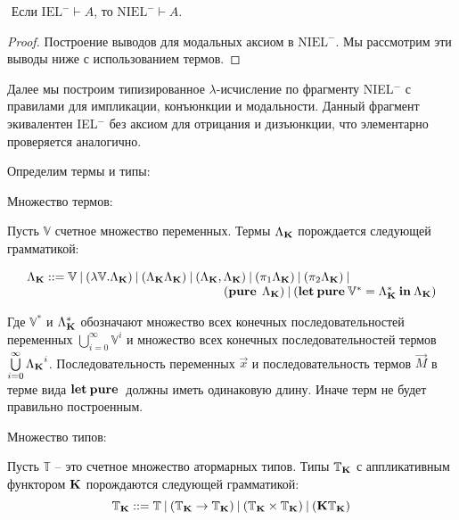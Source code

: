 \begin{lemma}
$ $
Если $\text{IEL}^{-} \vdash A$, то $\text{NIEL}^{-} \vdash A$.
\end{lemma}

\begin{proof}
Построение выводов для модальных аксиом в $\text{NIEL}^{-}$. Мы рассмотрим эти выводы ниже с использованием термов.
\end{proof}

\vspace{\baselineskip}

Далее мы построим типизированное $\lambda$-исчисление по фрагменту NIEL$^{-}$ с правилами для импликации, конъюнкции и модальности.
Данный фрагмент экивалентен IEL$^{-}$ без аксиом для отрицания и дизъюнкции, что элементарно проверяется аналогично.

Определим термы и типы:

\vspace{\baselineskip}

\begin{defin} Множество термов:

Пусть $\mathbb{V}$ счетное множество переменных. Термы $\Lambda_{{\bf K}}$ порождается следующей грамматикой:

$\begin{array}{lll}
& \Lambda_{{\bf K}} ::= \mathbb{V} \: | \:  (\lambda \mathbb{V}.\Lambda_{{\bf K}}) \: | \: (\Lambda_{{\bf K}}\Lambda_{{\bf K}}) \: | \: (\Lambda_{{\bf K}} , \Lambda_{{\bf K}}) \: | \: (\pi_1 \Lambda_{{\bf K}}) \: | \: (\pi_2 \Lambda_{{\bf K}}) \: | & \\
& \quad\quad\quad\quad\quad\quad\quad\quad\quad\quad\quad\quad\quad\quad\quad\quad ({\bf pure \: } \: \Lambda_{{\bf K}}) \: | \: ({\bf let \: pure \:} \mathbb{V}^{*} = \Lambda_{{\bf K}}^{*} {\: \bf in \:} \Lambda_{{\bf K}})
\end{array}$

\end{defin}

Где $\mathbb{V}^{*}$ и $\Lambda_{{\bf K}}^{*}$ обозначают множество всех конечных последовательностей переменных $\bigcup \limits_{i=0}^{\infty} \mathbb{V}^i$
и множество всех конечных последовательностей термов $\bigcup \limits_{i = 0}^{\infty} {\Lambda_{{\bf K}}}^i $. Последовательность переменных $\vec{x}$ и последовательность термов $\vec{M}$ в терме вида ${\bf let \: pure \:}$ должны иметь одинаковую длину.
Иначе терм не будет правильно построенным.

\begin{defin} Множество типов:

Пусть $\mathbb{T}$ -- это счетное множество атормарных типов. Типы $\mathbb{T}_{{\bf K}}$ с аппликативным функтором ${\bf K}$ порождаются следующей грамматикой:
\begin{equation}
  \mathbb{T}_{{\bf K}} ::= \mathbb{T} \: | \: (\mathbb{T}_{{\bf K}} \to \mathbb{T}_{{\bf K}}) \: |
  \: (\mathbb{T}_{{\bf K}} \times \mathbb{T}_{{\bf K}}) \: | \: ({\bf K}\mathbb{T}_{{\bf K}})
\end{equation}
\end{defin}

